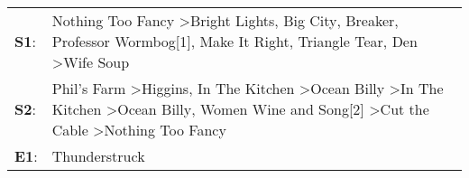 \begin{supertabular}{p{0.03\textwidth}p{0.92\textwidth}}
 \textbf{S1}:  &                                                                                              Nothing Too Fancy\textsuperscript{} \textgreater \enspace Bright Lights, Big City\textsuperscript{}, \enspace Breaker\textsuperscript{}, \enspace Professor Wormbog[1]\textsuperscript{}, \enspace Make It Right\textsuperscript{}, \enspace Triangle Tear\textsuperscript{}, \enspace Den\textsuperscript{} \textgreater \enspace Wife Soup\textsuperscript{}  \enspace  \\
 \textbf{S2}:  &  Phil's Farm\textsuperscript{} \textgreater \enspace Higgins\textsuperscript{}, \enspace In The Kitchen\textsuperscript{} \textgreater \enspace Ocean Billy\textsuperscript{} \textgreater \enspace In The Kitchen\textsuperscript{} \textgreater \enspace Ocean Billy\textsuperscript{}, \enspace Women Wine and Song[2]\textsuperscript{} \textgreater \enspace Cut the Cable\textsuperscript{} \textgreater \enspace Nothing Too Fancy\textsuperscript{}  \enspace  \\
 \textbf{E1}:  &                                                                                                                                                                                                                                                                                                                                                                                                                             Thunderstruck\textsuperscript{}  \enspace  \\
\end{supertabular}
